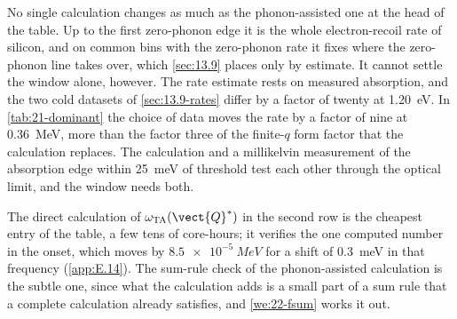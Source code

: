 No single calculation changes as much as the phonon-assisted one at the head of the table. Up to the first zero-phonon edge it is the whole electron-recoil rate of silicon, and on common bins with the zero-phonon rate it fixes where the zero-phonon line takes over, which \cref{sec:13.9} places only by estimate. It cannot settle the window alone, however. The rate estimate rests on measured absorption, and the two cold datasets of \cref{sec:13.9-rates} differ by a factor of twenty at \SI{1.20}{eV}. In \cref{tab:21-dominant} the choice of data moves the rate by a factor of nine at \SI{0.36}{MeV}, more than the factor three of the finite-$q$ form factor that the calculation replaces. The calculation and a millikelvin measurement of the absorption edge within \SI{25}{meV} of threshold test each other through the optical limit, and the window needs both.

The direct calculation of $\omega_{\mathrm{TA}}(\vect{Q}^*)$ in the second row is the cheapest entry of the table, a few tens of core-hours; it verifies the one computed number in the onset, which moves by $\SI{8.5e-5}{MeV}$ for a shift of \SI{0.3}{meV} in that frequency (\cref{app:E.14}). The sum-rule check of the phonon-assisted calculation is the subtle one, since what the calculation adds is a small part of a sum rule that a complete calculation already satisfies, and \cref{we:22-fsum} works it out.

